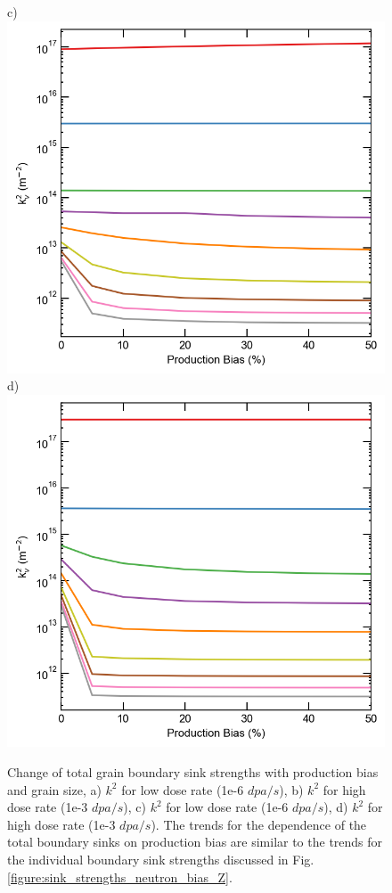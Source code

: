 \documentclass[utf8]{frontiersSCNS} %
\begin{document}
\begin{figure}[h!]
        c)\includegraphics[scale=0.55]{Fig11_c}
        d)\includegraphics[scale=0.55]{Fig11_d}
        \caption{Change of total grain boundary sink strengths with production bias and grain size, a) $k^2$ for low dose rate (1e-6 $dpa/s$), b) $k^2$ for high dose rate (1e-3 $dpa/s$), c) $k^2$ for low dose rate (1e-6 $dpa/s$), d) $k^2$ for high dose rate (1e-3 $dpa/s$). The trends for the dependence of the total boundary sinks on production bias are similar to the trends for the individual boundary sink strengths discussed in Fig. \ref{figure:sink_strengths_neutron_bias_Z}.  }
        \label{figure:sink_strengths_neutron_bias_k}
    \end{figure}
\end{document}
